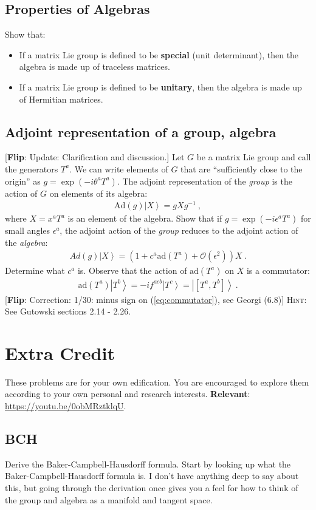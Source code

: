 \documentclass[12pt]{article}
\numberwithin{equation}{subsection}    %
\newcommand{\ket}[1]{\left|#1\right\rangle}    %
\newcommand{\flip}[1]{{\color{red} [\textbf{Flip}: {#1}]}}
\begin{document}
\subsection{Properties of Algebras}

Show that:
\begin{itemize}
  \item If a matrix Lie group is defined to be \textbf{special} (unit determinant), then the algebra is made up of traceless matrices.
  \item If a matrix Lie group is defined to be \textbf{unitary}, then the algebra is made up of Hermitian matrices.
\end{itemize}

\subsection{Adjoint representation of a group, algebra}

\flip{Update: Clarification and discussion.} Let $G$ be a matrix Lie group and call the generators $T^a$. We can write elements of $G$ that are ``sufficiently close to the origin'' as $g = \exp(-i\theta^a T^a)$. The adjoint representation of the \emph{group} is the action of $G$ on elements of its algebra:
\begin{align}
  \text{Ad}(g) \ket{X} = g X g^{-1} \ ,
\end{align}
where $X = x^a T^a$ is an element of the algebra.
Show that if $g = \exp(-i\epsilon^a T^a)$ for small angles $\epsilon^a$, the adjoint action of the \emph{group} reduces to the adjoint action of the \emph{algebra}:
\begin{align}
  Ad(g) \ket{X} = \left(1 + c^a \text{ad}(T^a) + \mathcal O(\epsilon^2) \right) X \ .
\end{align}
Determine what $c^a$ is. Observe that the action of $\text{ad}(T^a)$ on $X$ is a commutator:
\begin{align}
    \text{ad}(T^a)\ket{T^b} = -if^{acb}\ket{T^c} = \ket{[T^a,T^b]} \ .
    \label{eq:commutator}
\end{align}
\flip{Correction: 1/30: minus sign on (\ref{eq:commutator}), see Georgi (6.8)}
%
\textsc{Hint}: See Gutowski sections 2.14 - 2.26.

\section*{Extra Credit}

These problems are for your own edification. You are encouraged to explore them according to your own personal and research interests. \textbf{Relevant}: \url{https://youtu.be/0obMRztklqU}.


\subsection*{BCH}

Derive the Baker-Campbell-Hausdorff formula. Start by looking up what the Baker-Campbell-Hausdorff formula is. I don't have anything deep to say about this, but going through the derivation once gives you a feel for how to think of the group and algebra as a manifold and tangent space.
\end{document}
